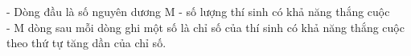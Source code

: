 - Dòng đầu là số nguyên dương M - số lượng thí sinh có khả năng thắng cuộc   
\\   - M dòng sau mỗi dòng ghi một số là chỉ số của thí sinh có khả năng thắng cuộc theo thứ tự tăng dần của chỉ số.